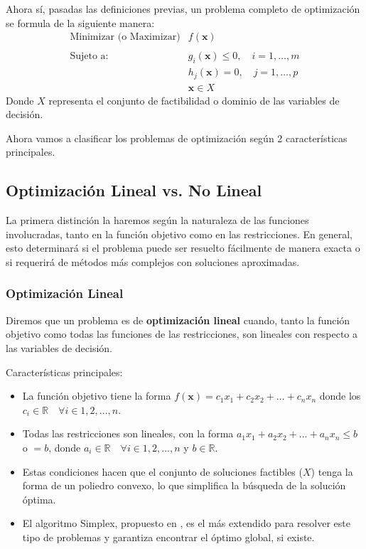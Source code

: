 \documentclass[12pt,a4paper]{book}
\begin{document}
Ahora sí, pasadas las definiciones previas, un problema completo de optimización se formula de la siguiente manera:
$$
\begin{array}{ll}
\text{Minimizar (o Maximizar)} & f(\mathbf{x}) \\ \\
\text{Sujeto a:} & g_i(\mathbf{x}) \le 0, \quad i = 1, \ldots, m \\
& h_j(\mathbf{x}) = 0, \quad j = 1, \ldots, p \\
& \mathbf{x} \in X
\end{array}
$$
Donde $X$ representa el conjunto de factibilidad o dominio de las variables de decisión.

Ahora vamos a clasificar los problemas de optimización según 2 características principales.

\subsection{Optimización Lineal vs. No Lineal}

La primera distinción la haremos según la naturaleza de las funciones involucradas, tanto en la función objetivo como en las restricciones. En general, esto determinará si el problema puede ser resuelto fácilmente de manera exacta o si requerirá de métodos más complejos con soluciones aproximadas.

\subsubsection{Optimización Lineal}
Diremos que un problema es de \textbf{optimización lineal} cuando, tanto la función objetivo como todas las funciones de las restricciones, son lineales con respecto a las variables de decisión. 

Características principales:
\begin{itemize}
    \item La función objetivo tiene la forma $f(\mathbf{x})=c_1x_1+c_2x_2+...+c_nx_n$ donde los $c_i \in \mathbb{R} \quad \forall i \in 1,2,...,n$.
    \item Todas las restricciones son lineales, con la forma $a_1x_1+a_2x_2+...+a_nx_n\leq b$ o $=b$, donde $a_i \in \mathbb{R} \quad \forall i \in 1,2,...,n$ y $b\in \mathbb{R}$.
    \item Estas condiciones hacen que el conjunto de soluciones factibles ($X$) tenga la forma de un poliedro convexo, lo que simplifica la búsqueda de la solución óptima.
    \item El algoritmo Simplex, propuesto en \cite{Dantzig1951}, es el más extendido para resolver este tipo de problemas y garantiza encontrar el óptimo global, si existe.
\end{itemize}
\end{document}
